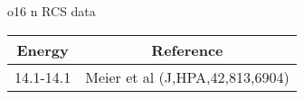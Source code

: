 \caption{o16 n RCS data}\begin{tabular}{|c||c|} 
 \hline 
\bf{Energy} & \bf{Reference} \\
 \hline
 \hline 
14.1-14.1 & Meier et al (J,HPA,42,813,6904)\\
\end{tabular}
